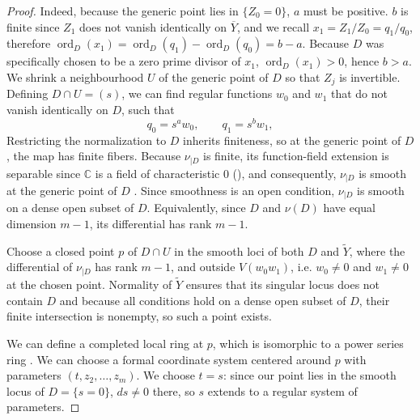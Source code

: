 \documentclass[11pt]{amsart}
\numberwithin{equation}{section}
\theoremstyle{plain}
\theoremstyle{remark}
\newcommand{\ord}{\operatorname{ord}}
\begin{document}
\begin{proof}
Indeed, because the generic point lies in $\{Z_0=0\}$, $a$ must be positive. $b$ is finite since $Z_1$
does not vanish identically on $\overline Y$, and we recall $x_1=Z_1/Z_0=q_1/q_0$, therefore $\ord_D(x_1) = \ord_D(q_1)-\ord_D(q_0) = b-a$. Because $D$ was specifically chosen to be a zero prime divisor of $x_1$, $\ord_D(x_1)>0$, hence $b>a.$
We shrink a neighbourhood $U$ of the generic point of $D$ so that $Z_j$ is
invertible. Defining $D\cap U=(s)$, we can find regular functions $w_0$ and $w_1$ that do not vanish identically on $D$, such that
\[ q_0=s^aw_0,\qquad q_1=s^bw_1,\]
Restricting the normalization to $D$ inherits finiteness, so at the generic point of $D$, the map has finite fibers.
Because $\nu_{|D}$ is finite, its function-field extension is separable since $\mathbb C$ is a field of characteristic 0 (\cite[Tag 0322]{Stacks}), and consequently, $\nu_{|D}$ is smooth at the generic point of $D$ \cite[Tag 07ND]{Stacks}.
 Since smoothness is an open condition, $\nu_{|D}$
is smooth on a dense open subset of $D$. Equivalently, since $D$ and $\nu(D)$ have equal dimension
$m-1$, its differential has rank $m-1$.

Choose a closed point $p$ of $D\cap U$ in the smooth loci of both $D$ and
$\widetilde Y$, where the differential of $\nu_{|D}$ has rank $m-1$, and
outside $V(w_0w_1)$, i.e. $w_0\neq 0$ and $w_1\neq 0$ at the chosen point. Normality of $\widetilde Y$ ensures that its singular locus does not contain $D$ and because all conditions hold on a dense open subset of $D$, their finite intersection is nonempty, so such a point exists.

We can define a completed local ring at $p$, which is isomorphic to a power series ring \cite[Tag 0C0S, Lemma 10.160.10]{Stacks}. We can choose a formal coordinate system centered around $p$ with parameters
$(t,z_2,\ldots,z_m)$. We choose $t=s$: since our point lies in the smooth locus of $D = \{s = 0\}$, $ds\neq 0$ there, so $s$ extends to a regular system of parameters.



\end{proof}
\end{document}
